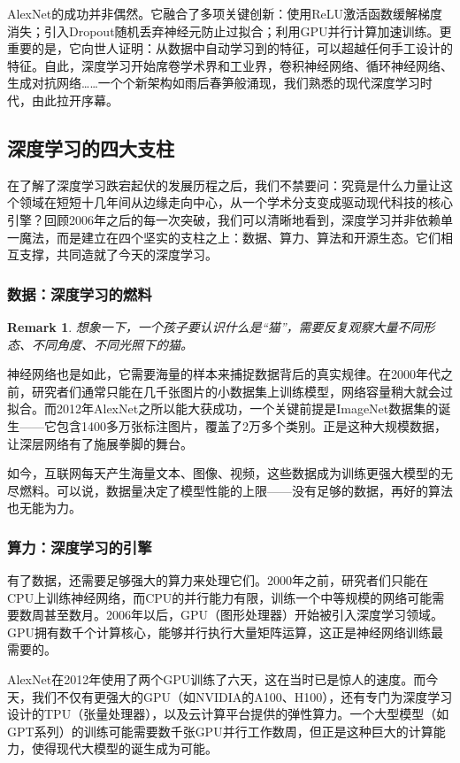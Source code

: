 \documentclass[lang=cn,zihao=-4,a4paper,fontset=windows]{beautybook}
\newtheorem*{remark}{\textbf{Remark}}
\begin{document}
AlexNet的成功并非偶然。它融合了多项关键创新：使用ReLU激活函数缓解梯度消失；引入Dropout随机丢弃神经元防止过拟合；利用GPU并行计算加速训练。更重要的是，它向世人证明：从数据中自动学习到的特征，可以超越任何手工设计的特征。自此，深度学习开始席卷学术界和工业界，卷积神经网络、循环神经网络、生成对抗网络……一个个新架构如雨后春笋般涌现，我们熟悉的现代深度学习时代，由此拉开序幕。

\subsection{深度学习的四大支柱}

在了解了深度学习跌宕起伏的发展历程之后，我们不禁要问：究竟是什么力量让这个领域在短短十几年间从边缘走向中心，从一个学术分支变成驱动现代科技的核心引擎？回顾2006年之后的每一次突破，我们可以清晰地看到，深度学习并非依赖单一魔法，而是建立在四个坚实的支柱之上：数据、算力、算法和开源生态。它们相互支撑，共同造就了今天的深度学习。

\subsubsection*{数据：深度学习的燃料}
\begin{remark}
想象一下，一个孩子要认识什么是“猫”，需要反复观察大量不同形态、不同角度、不同光照下的猫。
\end{remark}
神经网络也是如此，它需要海量的样本来捕捉数据背后的真实规律。在2000年代之前，研究者们通常只能在几千张图片的小数据集上训练模型，网络容量稍大就会过拟合。而2012年AlexNet之所以能大获成功，一个关键前提是ImageNet数据集的诞生——它包含1400多万张标注图片，覆盖了2万多个类别。正是这种大规模数据，让深层网络有了施展拳脚的舞台。

如今，互联网每天产生海量文本、图像、视频，这些数据成为训练更强大模型的无尽燃料。可以说，数据量决定了模型性能的上限——没有足够的数据，再好的算法也无能为力。

\subsubsection*{算力：深度学习的引擎}

有了数据，还需要足够强大的算力来处理它们。2000年之前，研究者们只能在CPU上训练神经网络，而CPU的并行能力有限，训练一个中等规模的网络可能需要数周甚至数月。2006年以后，GPU（图形处理器）开始被引入深度学习领域。GPU拥有数千个计算核心，能够并行执行大量矩阵运算，这正是神经网络训练最需要的。

AlexNet在2012年使用了两个GPU训练了六天，这在当时已是惊人的速度。而今天，我们不仅有更强大的GPU（如NVIDIA的A100、H100），还有专门为深度学习设计的TPU（张量处理器），以及云计算平台提供的弹性算力。一个大型模型（如GPT系列）的训练可能需要数千张GPU并行工作数周，但正是这种巨大的计算能力，使得现代大模型的诞生成为可能。
\end{document}
